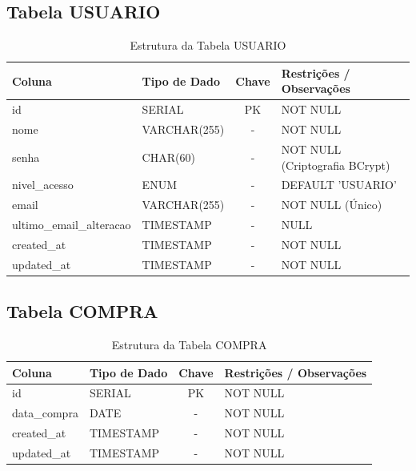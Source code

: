 \documentclass[
	12pt,				%
	openany,			%
	oneside,			%
	a4paper,			%
	english,			%
	french,				%
	spanish,			%
	brazil				%
	]{abntex2}
\begin{document}
\begin{apendicesenv}
\subsection{Tabela USUARIO}
\begin{table}[H]
\centering
\caption{Estrutura da Tabela USUARIO}
\begin{tabular}{|l|p{4cm}|c|p{6cm}|}
\hline
\textbf{Coluna} & \textbf{Tipo de Dado} & \textbf{Chave} & \textbf{Restrições / Observações} \\ \hline
id & SERIAL & PK & NOT NULL \\ \hline
nome & VARCHAR(255) & - & NOT NULL \\ \hline
senha & CHAR(60) & - & NOT NULL (Criptografia BCrypt) \\ \hline
nivel\_acesso & ENUM & - & DEFAULT 'USUARIO' \\ \hline
email & VARCHAR(255) & - & NOT NULL (Único) \\ \hline
ultimo\_email\_alteracao & TIMESTAMP & - & NULL \\ \hline
created\_at & TIMESTAMP & - & NOT NULL \\ \hline
updated\_at & TIMESTAMP & - & NOT NULL \\ \hline
\end{tabular}
\end{table}

\subsection{Tabela COMPRA}
\begin{table}[H]
\centering
\caption{Estrutura da Tabela COMPRA}
\begin{tabular}{|l|p{4cm}|c|p{6cm}|}
\hline
\textbf{Coluna} & \textbf{Tipo de Dado} & \textbf{Chave} & \textbf{Restrições / Observações} \\ \hline
id & SERIAL & PK & NOT NULL \\ \hline
data\_compra & DATE & - & NOT NULL \\ \hline
created\_at & TIMESTAMP & - & NOT NULL \\ \hline
updated\_at & TIMESTAMP & - & NOT NULL \\ \hline
\end{tabular}
\end{table}


\end{apendicesenv}
\end{document}
